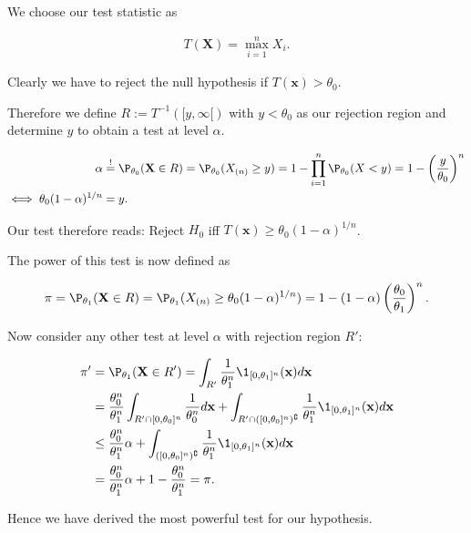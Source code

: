 \begin{solution}

We choose our test statistic as
    
\begin{align*}
    T(\textbf{X}) = \max_{i=1}^n X_i.
\end{align*}

Clearly we have to reject the null hypothesis if $T(\textbf{x}) > \theta_0$.

Therefore we define $R := T^{-1}([y,\infty[)$ with $y < \theta_0$ as our rejection region and determine $y$
to obtain a test at level $\alpha$.

\begin{align*}
    \alpha &\stackrel{!}{=} \P_{\theta_0}(\textbf{X} \in R)
    = \P_{\theta_0}(X_{(n)} \geq y) 
    = 1 - \prod_{i=1}^n \P_{\theta_0}(X < y)
    = 1 - \left(\frac{y}{\theta_0}\right)^n \\
    \iff \theta_0(1 - \alpha)^{1/n} &= y.
\end{align*}

Our test therefore reads: Reject $H_0$ iff $T(\textbf{x}) \geq \theta_0(1 - \alpha)^{1/n}$.

The power of this test is now defined as

\begin{align*}
    \pi = \P_{\theta_1}(\textbf{X} \in R)
    = \P_{\theta_1}(X_{(n)} \geq \theta_0(1 - \alpha)^{1/n})
    = 1 - (1 - \alpha)\left(\frac{\theta_0}{\theta_1}\right)^n.
\end{align*}

Now consider any other test at level $\alpha$ with rejection region $R'$:

\begin{align*}
    \pi' &= \P_{\theta_1}(\textbf{X} \in R')
    = \int_{R'} \frac{1}{\theta_1^n}\1_{[0,\theta_1]^n}(\textbf{x}) d\textbf{x} \\
    &= \frac{\theta_0^n}{\theta_1^n}\int_{R'\cap [0,\theta_0]^n} \frac{1}{\theta_0^n} d\textbf{x}
    + \int_{R'\cap ([0,\theta_0]^n)^\complement} \frac{1}{\theta_1^n}\1_{[0,\theta_1]^n}(\textbf{x}) d\textbf{x} \\
    &\leq \frac{\theta_0^n}{\theta_1^n}\alpha
    + \int_{([0,\theta_0]^n)^\complement} \frac{1}{\theta_1^n}\1_{[0,\theta_1]^n}(\textbf{x}) d\textbf{x} \\
    &= \frac{\theta_0^n}{\theta_1^n}\alpha
    + 1 - \frac{\theta_0^n}{\theta_1^n} = \pi.
\end{align*}

Hence we have derived the most powerful test for our hypothesis.
\end{solution}

